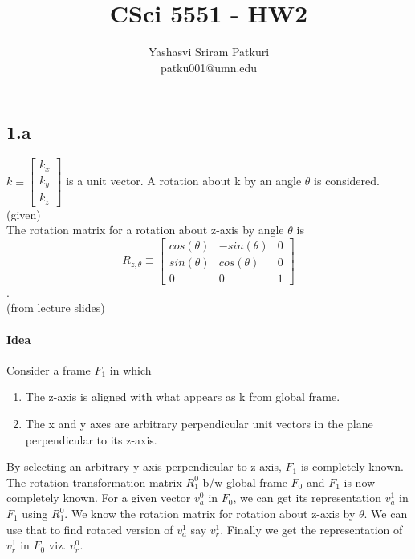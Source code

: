 \documentclass[12pt]{article}
\title{CSci 5551 - HW2}
\author{Yashasvi Sriram Patkuri\\patku001@umn.edu}
\newcommand{\fromslides}{{\\ \color{blue} \hspace*{\fill}(from lecture slides)} \\}
\newcommand{\given}{{\\ \color{blue} \hspace*{\fill}(given)} \\}
\newcommand{\rz}[1]{\begin{bmatrix} cos(#1) & -sin(#1) & 0 \\ sin(#1) & cos(#1) & 0 \\ 0 & 0 & 1 \end{bmatrix}}
\begin{document}
\maketitle
\pagebreak

\section{}
\subsection*{1.a}
$ k \equiv \begin{bmatrix} k_x \\ k_y \\ k_z \end{bmatrix} $ is a unit vector.
A rotation about k by an angle $\theta$ is considered.
\given

The rotation matrix for a rotation about z-axis by angle $\theta$ is
\[
  R_{z,\theta} \equiv \rz{\theta}
\].
\fromslides

\paragraph{Idea}
Consider a frame $ F_1 $ in which
\begin{enumerate}[nolistsep]
  \item The z-axis is aligned with what appears as k from global frame.
  \item The x and y axes are arbitrary perpendicular unit vectors in the plane perpendicular to its z-axis.
\end{enumerate}
By selecting an arbitrary y-axis perpendicular to z-axis, $ F_1 $ is completely known.
The rotation transformation matrix $ R_1^0 $ b/w global frame $ F_0 $ and $ F_1 $ is now completely known.
For a given vector $ v^0_a $ in $ F_0 $, we can get its representation $ v^1_a $ in $ F_1 $ using $ R_1^0 $.
We know the rotation matrix for rotation about z-axis by $\theta$.
We can use that to find rotated version of $ v^1_a $ say $ v^1_r $.
Finally we get the representation of $ v^1_r $ in $ F_0 $ viz. $ v^0_r $.
\end{document}
